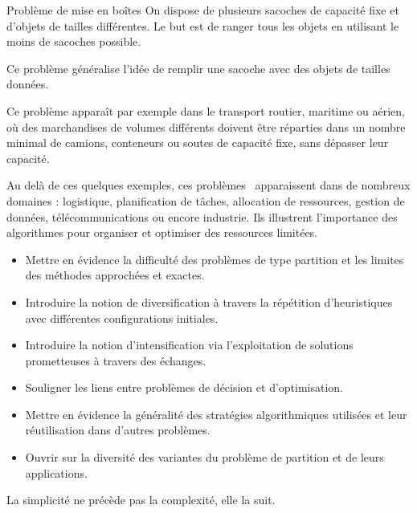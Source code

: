 \documentclass[a4paper,twoside]{article}
\begin{document}
\begin{definition}{Problème de mise en boîtes}
  On dispose de plusieurs sacoches de capacité fixe et d'objets de tailles différentes.
  Le but est de ranger tous les objets en utilisant le moins de sacoches possible.

  Ce problème généralise l'idée de remplir une sacoche avec des objets de tailles données.
\end{definition}

Ce problème apparaît par exemple dans le transport routier, maritime ou aérien, où des marchandises de volumes différents doivent être réparties dans un nombre minimal de camions, conteneurs ou soutes de capacité fixe, sans dépasser leur capacité.

Au delà de ces quelques exemples, ces problèmes~\cite{PP,SSP,KP,MS,BP} apparaissent dans de nombreux domaines : logistique, planification de tâches, allocation de ressources, gestion de données, télécommunications ou encore industrie.
Ils illustrent l'importance des algorithmes pour organiser et optimiser des ressources limitées.

\begin{debriefing}
  \begin{itemize}
  \item Mettre en évidence la difficulté des problèmes de type partition et les limites des méthodes approchées et exactes.
  \item Introduire la notion de diversification à travers la répétition d'heuristiques avec différentes configurations initiales.
  \item Introduire la notion d'intensification via l'exploitation de solutions prometteuses à travers des échanges.
  \item Souligner les liens entre problèmes de décision et d'optimisation.
  \item Mettre en évidence la généralité des stratégies algorithmiques utilisées et leur réutilisation dans d'autres problèmes.
  \item Ouvrir sur la diversité des variantes du problème de partition et de leurs applications.
  \end{itemize}
\end{debriefing}


\begin{epigramme}
  La simplicité ne précède pas la complexité, elle la suit.
\end{epigramme}

\clearpage
\ifleaflet
  ~
  \cleardoublepage
\fi
\end{document}
